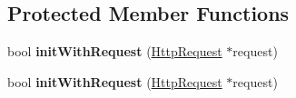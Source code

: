 \subsection*{Protected Member Functions}
\begin{DoxyCompactItemize}
\item 
\mbox{\label{classnetwork_1_1HttpResponse_aaaa61b0e8354649fbfe5745e9717dbaf}} 
bool {\bfseries init\+With\+Request} (\hyperlink{classnetwork_1_1HttpRequest}{Http\+Request} $\ast$request)
\item 
\mbox{\label{classnetwork_1_1HttpResponse_aaaa61b0e8354649fbfe5745e9717dbaf}} 
bool {\bfseries init\+With\+Request} (\hyperlink{classnetwork_1_1HttpRequest}{Http\+Request} $\ast$request)
\end{DoxyCompactItemize}
